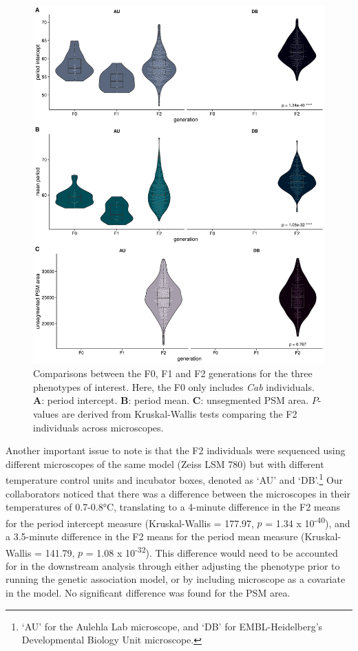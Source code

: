 \documentclass[
]{book}
\begin{document}
\begin{figure}
\includegraphics[width=1\linewidth]{figs/somites/phenotypes} \caption{Comparisons between the F0, F1 and F2 generations for the three phenotypes of interest. Here, the F0 only includes \emph{Cab} individuals. \textbf{A}: period intercept. \textbf{B}: period mean. \textbf{C}: unsegmented PSM area. \(P\)-values are derived from Kruskal-Wallis tests comparing the F2 individuals across microscopes.}\label{fig:somite-phenos}
\end{figure}

Another important issue to note is that the F2 individuals were sequenced using different microscopes of the same model (Zeiss LSM 780) but with different temperature control units and incubator boxes, denoted as `AU' and `DB'.\footnote{`AU' for the Aulehla Lab microscope, and `DB' for EMBL-Heidelberg's Developmental Biology Unit microscope.} Our collaborators noticed that there was a difference between the microscopes in their temperatures of 0.7-0.8°C, translating to a 4-minute difference in the F2 means for the period intercept measure (Kruskal-Wallis = 177.97, \(p\) = 1.34 x 10\textsuperscript{-40}), and a 3.5-minute difference in the F2 means for the period mean measure (Kruskal-Wallis = 141.79, \(p\) = 1.08 x 10\textsuperscript{-32}). This difference would need to be accounted for in the downstream analysis through either adjusting the phenotype prior to running the genetic association model, or by including microscope as a covariate in the model. No significant difference was found for the PSM area.
\end{document}
